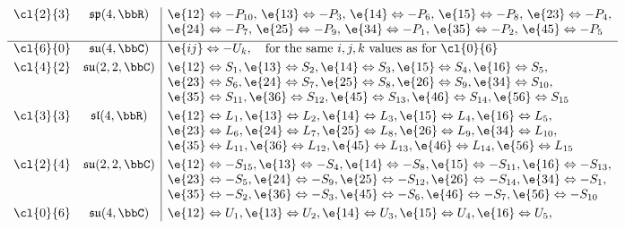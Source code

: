 \begin{unit}
\[\begin{array}{cc|l}
\cl{2}{3}& {\mathfrak{sp}}(4,\bbR)&\e{12}\Leftrightarrow -P_{10},\,\e{13}\Leftrightarrow -P_3,\,\e{14}\Leftrightarrow -P_6,\,\e{15}\Leftrightarrow -P_8,\,\e{23}\Leftrightarrow -P_4,\\
        & &\e{24}\Leftrightarrow -P_7,\,\e{25}\Leftrightarrow -P_9,\,\e{34}\Leftrightarrow -P_1,\,\e{35}\Leftrightarrow -P_2,\,\e{45}\Leftrightarrow -P_{5}\\[3pt]
\hline
\cl{6}{0}& {\mathfrak{su}}(4,\bbC)&\e{ij}\Leftrightarrow -U_k,\textrm{\quad for the same $i,j,k$ values as for \cl{0}{6}}\\[3pt]
%
\cl{4}{2}& {\mathfrak{su}}(2,2,\bbC)&\e{12}\Leftrightarrow S_1,\e{13}\Leftrightarrow S_2,\e{14}\Leftrightarrow S_3,\e{15}\Leftrightarrow S_4,\e{16}\Leftrightarrow S_5,\\
& &\e{23}\Leftrightarrow S_6,\e{24}\Leftrightarrow S_7,\e{25}\Leftrightarrow S_8,\e{26}\Leftrightarrow S_9,\e{34}\Leftrightarrow S_{10},\\
& &\e{35}\Leftrightarrow S_{11},\e{36}\Leftrightarrow S_{12},\e{45}\Leftrightarrow S_{13},\e{46}\Leftrightarrow S_{14},\e{56}\Leftrightarrow S_{15}\\[3pt]
%
\cl{3}{3}& {\mathfrak{sl}}(4,\bbR)&\e{12}\Leftrightarrow L_1,\e{13}\Leftrightarrow L_2,\e{14}\Leftrightarrow L_3,\e{15}\Leftrightarrow L_4,\e{16}\Leftrightarrow L_5,\\
& &\e{23}\Leftrightarrow L_6,\e{24}\Leftrightarrow L_7,\e{25}\Leftrightarrow L_8,\e{26}\Leftrightarrow L_9,\e{34}\Leftrightarrow L_{10},\\
& &\e{35}\Leftrightarrow L_{11},\e{36}\Leftrightarrow L_{12},\e{45}\Leftrightarrow L_{13},\e{46}\Leftrightarrow L_{14},\e{56}\Leftrightarrow L_{15}\\[3pt]
%
\cl{2}{4}& {\mathfrak{su}}(2,2,\bbC)&\e{12}\Leftrightarrow -S_{15},\e{13}\Leftrightarrow -S_4,\e{14}\Leftrightarrow -S_8,\e{15}\Leftrightarrow -S_{11},\e{16}\Leftrightarrow -S_{13},\\
& &\e{23}\Leftrightarrow -S_5,\e{24}\Leftrightarrow -S_9,\e{25}\Leftrightarrow -S_{12},\e{26}\Leftrightarrow -S_{14},\e{34}\Leftrightarrow -S_{1},\\
& &\e{35}\Leftrightarrow -S_{2},\e{36}\Leftrightarrow -S_{3},\e{45}\Leftrightarrow -S_{6},\e{46}\Leftrightarrow -S_{7},\e{56}\Leftrightarrow -S_{10}\\[3pt]
%
\cl{0}{6}& {\mathfrak{su}}(4,\bbC)&\e{12}\Leftrightarrow U_1,\e{13}\Leftrightarrow U_2,\e{14}\Leftrightarrow U_3,\e{15}\Leftrightarrow U_4,\e{16}\Leftrightarrow U_5,\\

\end{array}\]
\end{unit}
